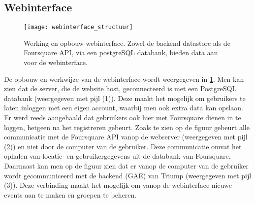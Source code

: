 \subsection{Webinterface}
\begin{figure}[H]
	\centering
	\texttt{[image: webinterface\_structuur]}
	\caption{Werking en opbouw webinterface. Zowel de backend datastore als de Foursquare API, via een postgreSQL databank, bieden data aan voor de webinterface. }
	\label{fig:Webinterface}
\end{figure}
De opbouw en werkwijze van de webinterface wordt weergegeven in \ref{fig:Webinterface}. Men kan zien dat de server, die de website host, geconnecteerd is met een PostgreSQL databank (weergegeven met pijl (1)). Deze maakt het mogelijk om gebruikers te laten inloggen met een eigen account, waarbij men ook extra data kan opslaan. Er werd reeds aangehaald dat gebruikers ook hier met Foursquare dienen in te loggen, hetgeen na het registreren gebeurt. Zoals te zien op de figuur gebeurt alle communicatie met de Foursquare API vanop de webserver (weergegeven met pijl (2)) en niet door de computer van de gebruiker. Deze communicatie omvat het ophalen van locatie- en gebruikergegevens uit de databank van Foursquare.
Daarnaast kan men op de figuur zien dat er vanop de computer van de gebruiker wordt gecommuniceerd met de backend (GAE) van Triump (weergegeven met pijl (3)). Deze verbinding maakt het mogelijk om vanop de webinterface nieuwe events aan te maken en groepen te beheren.


